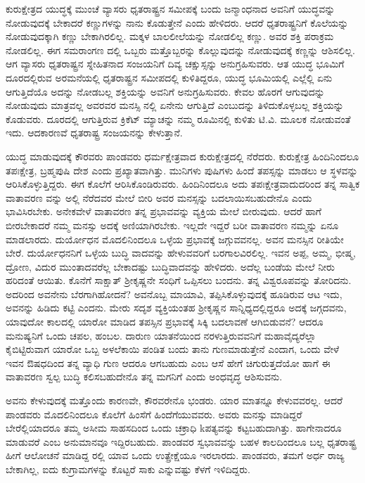 ಕುರುಕ್ಷೇತ್ರದ ಯುದ್ಧಕ್ಕೆ ಮುಂಚೆ ವ್ಯಾಸರು ಧೃತರಾಷ್ಟ್ರನ ಸಮೀಪಕ್ಕೆ ಬಂದು ಜನ್ಮಾಂಧನಾದ ಅವನಿಗೆ ಯುದ್ಧವನ್ನು ನೋಡುವುದಕ್ಕೆ ಬೇಕಾದರೆ ಕಣ್ಣುಗಳನ್ನು ನಾನು ಕೊಡುತ್ತೇನೆ ಎಂದು ಹೇಳಿದರು. ಆದರೆ ಧೃತರಾಷ್ಟ್ರನಿಗೆ ಕೊಲೆಯನ್ನು ನೋಡುವುದಕ್ಕಾಗಿ ಕಣ್ಣು ಬೇಕಾಗಿರಲಿಲ್ಲ. ಮಕ್ಕಳ ಬಾಲಲೀಲೆಯನ್ನು ನೋಡಲಿಲ್ಲ ಕಣ್ಣು. ಅವರ ಶಕ್ತಿ ಪರಾಕ್ರಮ ನೋಡಲಿಲ್ಲ. ಈಗ ಸಮರಾಂಗಣ ದಲ್ಲಿ ಒಬ್ಬರು ಮತ್ತೊಬ್ಬರನ್ನು ಕೊಲ್ಲುವುದನ್ನು ನೋಡುವುದಕ್ಕೆ ಕಣ್ಣನ್ನು ಆಶಿಸಲಿಲ್ಲ. ಆಗ ವ್ಯಾಸರು ಧೃತರಾಷ್ಟ್ರನ ಸ್ನೇಹಿತನಾದ ಸಂಜಯನಿಗೆ ದಿವ್ಯ ಚಕ್ಷುಸ್ಸನ್ನು ಅನುಗ್ರಹಿಸುವರು. ಆತ ಯುದ್ಧ ಭೂಮಿಗೆ ದೂರದಲ್ಲಿರುವ ಅರಮನೆಯಲ್ಲಿ ಧೃತರಾಷ್ಟ್ರನ ಸಮೀಪದಲ್ಲಿ ಕುಳಿತಿದ್ದರೂ, ಯುದ್ಧ ಭೂಮಿಯಲ್ಲಿ ಎಲ್ಲೆಲ್ಲಿ ಏನು ಆಗುತ್ತಿದೆಯೊ ಅದನ್ನು ನೋಡಬಲ್ಲ ಶಕ್ತಿಯನ್ನು ಅವನಿಗೆ ಅನುಗ್ರಹಿಸುವರು. ಕೇವಲ ಹೊರಗೆ ಆಗುವುದನ್ನು ನೋಡುವುದು ಮಾತ್ರವಲ್ಲ ಅವರವರ ಮನಸ್ಸಿ ನಲ್ಲಿ ಏನೇನು ಆಗುತ್ತಿದೆ ಎಂಬುದನ್ನು ತಿಳಿದುಕೊಳ್ಳಬಲ್ಲ ಶಕ್ತಿಯನ್ನು ಕೊಡುವರು. ದೂರದಲ್ಲಿ ಆಗುತ್ತಿರುವ ಕ್ರಿಕೆಟ್ ಮ್ಯಾಚನ್ನು ನಮ್ಮ ರೂಮಿನಲ್ಲಿ ಕುಳಿತು ಟಿ.ವಿ. ಮೂಲಕ ನೋಡುವಂತೆ ಇದು. ಆದಕಾರಣವೆ ಧೃತರಾಷ್ಟ್ರ ಸಂಜಯನನ್ನು ಕೇಳುತ್ತಾನೆ.

ಯುದ್ಧ ಮಾಡುವುದಕ್ಕೆ ಕೌರವರು ಪಾಂಡವರು ಧರ್ಮಕ್ಷೇತ್ರವಾದ ಕುರುಕ್ಷೇತ್ರದಲ್ಲಿ ನೆರೆದರು. ಕುರುಕ್ಷೇತ್ರ ಹಿಂದಿನಿಂದಲೂ ತಪಃಕ್ಷೇತ್ರ, ಬ್ರಹ್ಮಪುಷಿ ದೇಶ ಎಂದು ಪ್ರಖ್ಯಾತವಾಗಿತ್ತು. ಮುನಿಗಳು ಪುಷಿಗಳು ಹಿಂದೆ ತಪಸ್ಸನ್ನು ಮಾಡಲು ಆ ಸ್ಥಳವನ್ನು ಆರಿಸಿಕೊಳ್ಳುತ್ತಿದ್ದರು. ಈಗ ಕೊಲೆಗೆ ಆರಿಸಿಕೊಂಡಿರುವರು. ಹಿಂದಿನಿಂದಲೂ ಅದು ತಪಃಕ್ಷೇತ್ರವಾದುದರಿಂದ ತನ್ನ ಸಾತ್ವಿಕ ವಾತಾವರಣ ವನ್ನು ಅಲ್ಲಿ ನೆರೆದವರ ಮೇಲೆ ಬೀರಿ ಅವರ ಮನಸ್ಸನ್ನು ಬದಲಾಯಿಸಬಹುದೇನೊ ಎಂದು ಭಾವಿಸಿರಬೇಕು. ಅನೇಕವೇಳೆ ವಾತಾವರಣ ತನ್ನ ಪ್ರಭಾವವನ್ನು ವ್ಯಕ್ತಿಯ ಮೇಲೆ ಬೀರುವುದು. ಆದರೆ ಹಾಗೆ ಬೀರಬೇಕಾದರೆ ನಮ್ಮ ಮನಸ್ಸು ಅದಕ್ಕೆ ಅಣಿಯಾಗಿರಬೇಕು. ಇಲ್ಲದೇ ಇದ್ದರೆ ಬರೀ ವಾತಾವರಣ ನಮ್ಮನ್ನು ಏನೂ ಮಾಡಲಾರದು. ದುರ್ಯೋಧನ ಮೊದಲಿನಿಂದಲೂ ಒಳ್ಳೆಯ ಪ್ರಭಾವಕ್ಕೆ ಜಗ್ಗುವವನಲ್ಲ. ಅವನ ಮನಸ್ಸಿನ ರೀತಿಯೇ ಬೇರೆ. ದುರ್ಯೋಧನನಿಗೆ ಒಳ್ಳೆಯ ಬುದ್ಧಿ ವಾದವನ್ನು ಹೇಳುವವರಿಗೆ ಬರಗಾಲವಿರಲಿಲ್ಲ. ಇವನ ಅಪ್ಪ, ಅಮ್ಮ, ಭೀಷ್ಮ, ದ್ರೋಣ, ವಿದುರ ಮುಂತಾದವರೆಲ್ಲ ಬೇಕಾದಷ್ಟು ಬುದ್ಧಿವಾದವನ್ನು ಹೇಳಿದರು. ಅದೆಲ್ಲ ಬಂಡೆಯ ಮೇಲೆ ನೀರು ಹರಿದಂತೆ ಆಯಿತು. ಕೊನೆಗೆ ಸಾಕ್ಷಾತ್ ಶ್ರೀಕೃಷ್ಣನೇ ಸಂಧಿಗೆ ಒಪ್ಪಿಸಲು ಬಂದನು. ತನ್ನ ವಿಶ್ವರೂಪವನ್ನು ತೋರಿದನು. ಅದರಿಂದ ಅವನೇನು ಬೆರಗಾಗಿಹೋದನೆ? ಅವನೊಬ್ಬ ಮಾಯಾವಿ, ತಪ್ಪಿಸಿಕೊಳ್ಳುವುದಕ್ಕೆ ಹೂಡಿರುವ ಆಟ ಇದು, ಅವನನ್ನು ಹಿಡಿದು ಕಟ್ಟಿ ಎಂದನು. ಮೇರು ಸದೃಶ ವ್ಯಕ್ತಿಯಂತಹ ಶ್ರೀಕೃಷ್ಣನ ಸಾನ್ನಿಧ್ಯದಲ್ಲಿದ್ದರೂ ಅದಕ್ಕೆ ಜಗ್ಗದವನು, ಯಾವುದೋ ಕಾಲದಲ್ಲಿ ಯಾರೋ ಮಾಡಿದ ತಪಸ್ಸಿನ ಪ್ರಭಾವಕ್ಕೆ ಸಿಕ್ಕಿ ಬದಲಾವಣೆ ಆಗಿಬಿಡುವನೆ? ಆದರೂ ಮನುಷ್ಯನಿಗೆ ಒಂದು ಚಪಲ, ಹಂಬಲ. ದಾರುಣ ಯಾತನೆಯಿಂದ ನರಳುತ್ತಿರುವವನಿಗೆ ಮಹಾವೈದ್ಯರೆಲ್ಲಾ ಕೈಬಿಟ್ಟಿರುವಾಗ ಯಾರೋ ಒಬ್ಬ ಅಳಲೆಕಾಯಿ ಪಂಡಿತ ಬಂದು ತಾನು ಗುಣಮಾಡುತ್ತೇನೆ ಎಂದಾಗ, ಒಂದು ವೇಳೆ ಇವನ ಔಷಧದಿಂದ ತನ್ನ ವ್ಯಾಧಿ ಗುಣ ಆದರೂ ಆಗಬಹುದು ಎಂಬ ಆಸೆ ಹೇಗೆ ಚಿಗುರುತ್ತದೆಯೋ ಹಾಗೆ ಈ ವಾತಾವರಣ ಸ್ವಲ್ಪ ಬುದ್ಧಿ ಕಲಿಸಬಹುದೇನೊ ತನ್ನ ಮಗನಿಗೆ ಎಂದು ಅಂಧವೃದ್ಧ ಆಶಿಸುವನು.

ಅವನು ಕೇಳುವುದಕ್ಕೆ ಮತ್ತೊಂದು ಕಾರಣವೇ, ಕೌರವರೇನೊ ಭಂಡರು. ಯಾರ ಮಾತನ್ನೂ ಕೇಳುವವರಲ್ಲ. ಆದರೆ ಪಾಂಡವರು ಮೊದಲಿನಿಂದಲೂ ಕೊಲೆಗೆ ಹಿಂಸೆಗೆ ಹಿಂದೆಗೆಯುವವರು. ಅವರು ಮನಸ್ಸು ಮಾಡಿದ್ದರೆ ಬೇರೆಲ್ಲಿಯಾದರೂ ತಮ್ಮ ಅಸೀಮ ಸಾಹಸದಿಂದ ಒಂದು ಚಕ್ರಾಧಿ kಪತ್ಯವನ್ನು ಕಟ್ಟಬಹುದಾಗಿತ್ತು. ಹಾಗೇನಾದರೂ ಮಾಡುವರೆ ಎಂಬ ಅನುಮಾನವೂ ಇದ್ದಿರಬಹುದು. ಪಾಂಡವರ ಸ್ವಭಾವವನ್ನು ಬಹಳ ಕಾಲದಿಂದಲೂ ಬಲ್ಲ ಧೃತರಾಷ್ಟ್ರ ಹೀಗೆ ಆಲೋಚನೆ ಮಾಡಿದ್ದ ರಲ್ಲಿ ಯಾವ ಒಂದು ಉತ್ಪ್ರೇಕ್ಷೆಯೂ ಇರಲಾರದು. ಪಾಂಡವರು, ತಮಗೆ ಅರ್ಧ ರಾಜ್ಯ ಬೇಕಾಗಿಲ್ಲ, ಐದು ಕುಗ್ರಾಮಗಳನ್ನು ಕೊಟ್ಟರೆ ಸಾಕು ಎನ್ನುವಷ್ಟು ಕೆಳಗೆ ಇಳಿದಿದ್ದರು.

